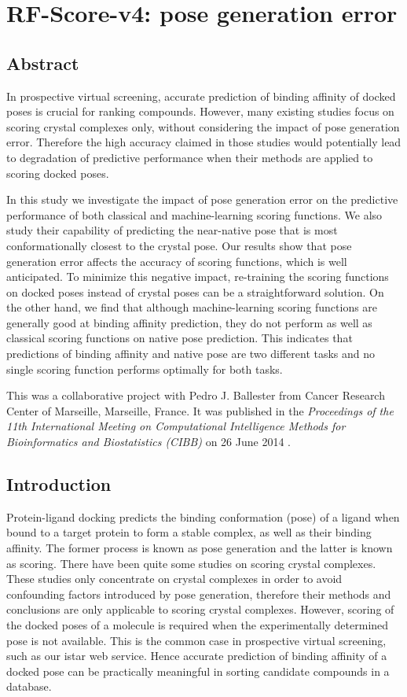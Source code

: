 \chapter{RF-Score-v4: pose generation error}

\section{Abstract}

In prospective virtual screening, accurate prediction of binding affinity of docked poses is crucial for ranking compounds. However, many existing studies focus on scoring crystal complexes only, without considering the impact of pose generation error. Therefore the high accuracy claimed in those studies would potentially lead to degradation of predictive performance when their methods are applied to scoring docked poses.

In this study we investigate the impact of pose generation error on the predictive performance of both classical and machine-learning scoring functions. We also study their capability of predicting the near-native pose that is most conformationally closest to the crystal pose. Our results show that pose generation error affects the accuracy of scoring functions, which is well anticipated. To minimize this negative impact, re-training the scoring functions on docked poses instead of crystal poses can be a straightforward solution. On the other hand, we find that although machine-learning scoring functions are generally good at binding affinity prediction, they do not perform as well as classical scoring functions on native pose prediction. This indicates that predictions of binding affinity and native pose are two different tasks and no single scoring function performs optimally for both tasks.

This was a collaborative project with Pedro J. Ballester from Cancer Research Center of Marseille, Marseille, France. It was published in the \textit{Proceedings of the 11th International Meeting on Computational Intelligence Methods for Bioinformatics and Biostatistics (CIBB)} on 26 June 2014 \citep{1434}.

\section{Introduction}

Protein-ligand docking predicts the binding conformation (pose) of a ligand when bound to a target protein to form a stable complex, as well as their binding affinity. The former process is known as pose generation and the latter is known as scoring. There have been quite some studies \citep{1432,1433} on scoring crystal complexes. These studies only concentrate on crystal complexes in order to avoid confounding factors introduced by pose generation, therefore their methods and conclusions are only applicable to scoring crystal complexes. However, scoring of the docked poses of a molecule is required when the experimentally determined pose is not available. This is the common case in prospective virtual screening, such as our istar web service. Hence accurate prediction of binding affinity of a docked pose can be practically meaningful in sorting candidate compounds in a database.

